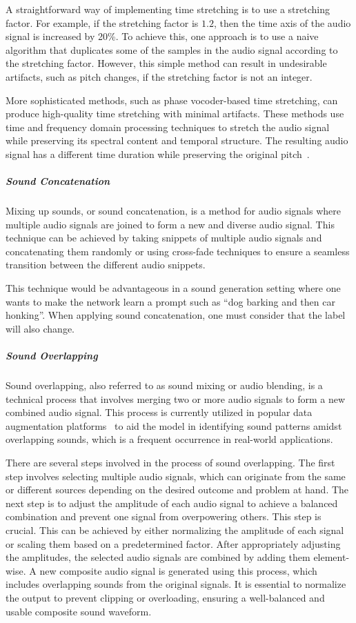 A straightforward way of implementing time stretching is to use a stretching factor. For example, if the stretching factor is $1.2$, then the time axis of the audio signal is increased by 20\%. To achieve this, one approach is to use a naive algorithm that duplicates some of the samples in the audio signal according to the stretching factor. However, this simple method can result in undesirable artifacts, such as pitch changes, if the stretching factor is not an integer.

More sophisticated methods, such as phase vocoder-based time stretching, can produce high-quality time stretching with minimal artifacts. These methods use time and frequency domain processing techniques to stretch the audio signal while preserving its spectral content and temporal structure. The resulting audio signal has a different time duration while preserving the original pitch~\cite{akaishi_improving_2023}.

\subparagraph{Sound Concatenation}
Mixing up sounds, or sound concatenation, is a method for audio signals where multiple audio signals are joined to form a new and diverse audio signal. This technique can be achieved by taking snippets of multiple audio signals and concatenating them randomly or using cross-fade techniques to ensure a seamless transition between the different audio snippets.

This technique would be advantageous in a sound generation setting where one wants to make the network learn a prompt such as ``dog barking and then car honking''. When applying sound concatenation, one must consider that the label will also change.

\subparagraph{Sound Overlapping}

Sound overlapping, also referred to as sound mixing or audio blending, is a technical process that involves merging two or more audio signals to form a new combined audio signal. This process is currently utilized in popular data augmentation platforms~\cite{maguolo_audiogmenter_2022} to aid the model in identifying sound patterns amidst overlapping sounds, which is a frequent occurrence in real-world applications.

There are several steps involved in the process of sound overlapping. The first step involves selecting multiple audio signals, which can originate from the same or different sources depending on the desired outcome and problem at hand. The next step is to adjust the amplitude of each audio signal to achieve a balanced combination and prevent one signal from overpowering others. This step is crucial. This can be achieved by either normalizing the amplitude of each signal or scaling them based on a predetermined factor. After appropriately adjusting the amplitudes, the selected audio signals are combined by adding them element-wise. A new composite audio signal is generated using this process, which includes overlapping sounds from the original signals. It is essential to normalize the output to prevent clipping or overloading, ensuring a well-balanced and usable composite sound waveform.

